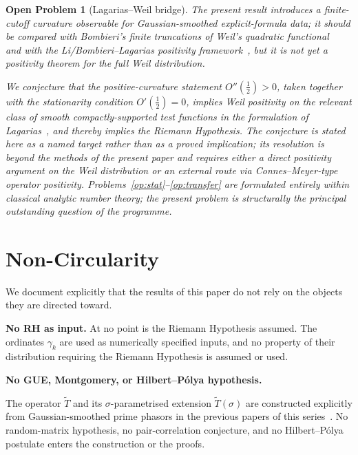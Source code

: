 \documentclass[11pt]{article}
\newtheorem{openproblem}[theorem]{Open Problem}
\newcommand{\Tt}{\widetilde{T}}
\begin{document}
\begin{openproblem}[Lagarias--Weil bridge]\label{op:weil}
\label{op:weil-bridge}
The present result introduces a finite-cutoff curvature observable
for Gaussian-smoothed explicit-formula data; it should be compared
with Bombieri's finite truncations of Weil's quadratic
functional~\cite{Bombieri} and with the Li/Bombieri--Lagarias
positivity framework~\cite{Li,BombieriLagarias}, but it is not yet a
positivity theorem for the full Weil distribution.

We conjecture that the positive-curvature statement
$O''(\tfrac12)>0$, taken together with the stationarity condition
$O'(\tfrac12)=0$, implies Weil positivity on the relevant class of
smooth compactly-supported test functions in the formulation of
Lagarias~\cite{Lagarias}, and thereby implies the Riemann Hypothesis.
The conjecture is stated here as a named target rather than as a
proved implication; its resolution is beyond the methods of the
present paper and requires either a direct positivity argument on the
Weil distribution or an external route via Connes--Meyer-type operator
positivity.
Problems~\ref{op:stat}--\ref{op:transfer} are formulated entirely within
classical analytic number theory; the present problem is structurally
the principal outstanding question of the programme.
\end{openproblem}

\section{Non-Circularity}
\label{sec:nocirc}

We document explicitly that the results of this paper do not rely on
the objects they are directed toward.

\textbf{No RH as input.}
At no point is the Riemann Hypothesis assumed.
The ordinates $\gamma_k$ are used as numerically specified inputs, and
no property of their distribution requiring the Riemann Hypothesis is
assumed or used.

\textbf{No GUE, Montgomery, or Hilbert--P\'olya hypothesis.}
{\sloppy
The operator $\Tt$ and its $\sigma$-parametrised extension
$\Tt(\sigma)$ are constructed explicitly from Gaussian-smoothed prime
phasors in the previous papers of this series~\cite{Paper3,Paper4,Paper5}.
No random-matrix hypothesis, no pair-correlation conjecture, and no
Hilbert--P\'olya postulate enters the construction or the proofs.
\par}
\end{document}
